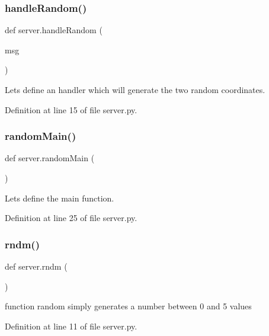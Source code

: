 \subsubsection{\texorpdfstring{handle\+Random()}{handleRandom()}}
{\footnotesize\ttfamily def server.\+handle\+Random (\begin{DoxyParamCaption}\item[{}]{msg }\end{DoxyParamCaption})}



Let\textquotesingle{}s define an handler which will generate the two random coordinates. 



Definition at line 15 of file server.\+py.

\mbox{\label{namespaceserver_a1032eb6dc59913e1baf09e9c0bd65cbf}} 
\subsubsection{\texorpdfstring{random\+Main()}{randomMain()}}
{\footnotesize\ttfamily def server.\+random\+Main (\begin{DoxyParamCaption}{ }\end{DoxyParamCaption})}



Let\textquotesingle{}s define the main function. 



Definition at line 25 of file server.\+py.

\mbox{\label{namespaceserver_a902741955d8bc8d124b63e5e36451576}} 
\subsubsection{\texorpdfstring{rndm()}{rndm()}}
{\footnotesize\ttfamily def server.\+rndm (\begin{DoxyParamCaption}{ }\end{DoxyParamCaption})}



function random simply generates a number between 0 and 5 values 



Definition at line 11 of file server.\+py.




